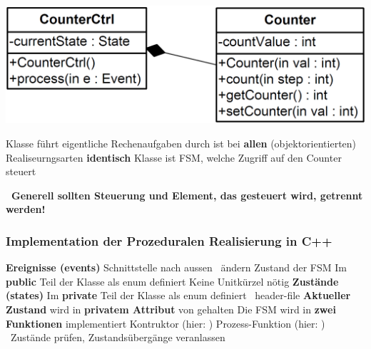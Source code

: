 \begin{center}
    \includegraphics[width=0.7\columnwidth]{images/fsm_CPP_klassendiagramm.png}
\end{center}

\begin{outline}
    \1 Klasse  führt eigentliche Rechenaufgaben durch
        \2 ist bei \textbf{allen} (objektorientierten) Realiseurngsarten \textbf{identisch}
    \1 Klasse  ist FSM, welche Zugriff auf den Counter steuert 
\end{outline}

\textbf{ \textrightarrow\ Generell sollten Steuerung und Element, das gesteuert wird, getrennt werden!}


\subsubsection{Implementation der Prozeduralen Realisierung in C++}

\begin{outline}
    \1 \textbf{Ereignisse (events)}
        \2 Schnittstelle nach aussen \textrightarrow\ ändern Zustand der FSM
        \2 Im \textbf{public} Teil der Klasse als enum definiert
        \2 Keine Unitkürzel nötig
    \1 \textbf{Zustände (states)}
        \2 Im \textbf{private} Teil der Klasse als enum definiert \textrightarrow\ header-file
    \1 \textbf{Aktueller Zustand}  wird in \textbf{privatem Attribut} von  gehalten
    \1 Die FSM wird in \textbf{zwei Funktionen} implementiert
        \2 Kontruktor (hier: )
        \2 Prozess-Funktion (hier: ) \\
            \textrightarrow\ Zustände prüfen, Zustandsübergänge veranlassen
\end{outline}



